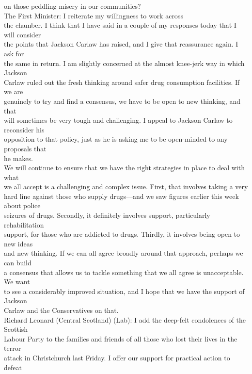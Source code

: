 \documentclass{article}
\begin{document}
\begin{description}
{on those peddling misery in our communities?\\
The First Minister: I reiterate my willingness to work across\\
the chamber. I think that I have said in a couple of my responses today that I will consider\\
the points that Jackson Carlaw has raised, and I give that reassurance again. I ask for\\
the same in return. I am slightly concerned at the almost knee-jerk way in which Jackson\\
Carlaw ruled out the fresh thinking around safer drug consumption facilities. If we are\\
genuinely to try and find a consensus, we have to be open to new thinking, and that\\
will sometimes be very tough and challenging. I appeal to Jackson Carlaw to reconsider his\\
opposition to that policy, just as he is asking me to be open-minded to any proposals that\\
he makes.\\
We will continue to ensure that we have the right strategies in place to deal with what\\
we all accept is a challenging and complex issue. First, that involves taking a very\\
hard line against those who supply drugs—and we saw figures earlier this week about police\\
seizures of drugs. Secondly, it definitely involves support, particularly rehabilitation\\
support, for those who are addicted to drugs. Thirdly, it involves being open to new ideas\\
and new thinking. If we can all agree broadly around that approach, perhaps we can build\\
a consensus that allows us to tackle something that we all agree is unacceptable. We want\\
to see a considerably improved situation, and I hope that we have the support of Jackson\\
Carlaw and the Conservatives on that.\\
Richard Leonard (Central Scotland) (Lab): I add the deep-felt condolences of the Scottish\\
Labour Party to the families and friends of all those who lost their lives in the terror\\
attack in Christchurch last Friday. I offer our support for practical action to defeat\\
}
\end{description}
\end{document}
